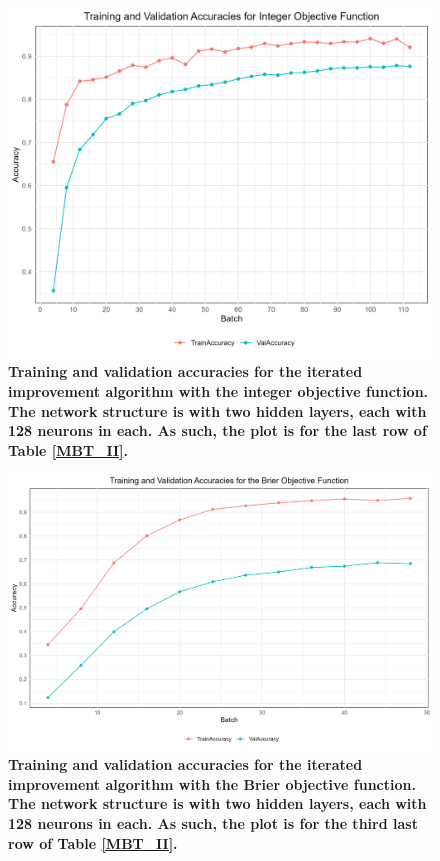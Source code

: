 \begin{figure}[H]
    \centering
    \includegraphics[width=1\linewidth]{Figures/MBT_II_INTEGER.png}
    \caption{\small{\textbf{Training and validation accuracies for the iterated improvement algorithm with the integer objective function. The network structure is with two hidden layers, each with 128 neurons in each. As such, the plot is for the last row of Table \ref{MBT_II}.}}}
    \label{MBT_II_INTEGER}
\end{figure}

\begin{figure}[H]
    \centering
    \includegraphics[width=1\linewidth]{Figures/MBT_II_BRIER.png}
    \caption{\small{\textbf{Training and validation accuracies for the iterated improvement algorithm with the Brier objective function. The network structure is with two hidden layers, each with 128 neurons in each. As such, the plot is for the third last row of Table \ref{MBT_II}.}}}
    \label{MBT_II_BRIER}
\end{figure}

